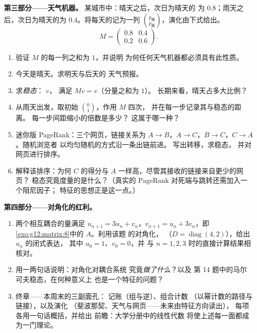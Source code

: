 \begin{problem}
\medskip
\noindent\textbf{第三部分——天气机器。}
某城市中：晴天之后，次日为晴天的
为 $0.8$；雨天之后，次日为晴天的为
$0.4$。将每天的记为一列
$\binom{p_{\text{晴}}}{p_{\text{雨}}}$，演化由下式给出。
\[
M = \begin{pmatrix} 0.8 & 0.4\\ 0.2 & 0.6 \end{pmatrix}.
\]
\begin{enumerate}[resume]
  \item 验证 $M$ 的每一列之和为 $1$，并说明
        为何任何天气机器都必须具有此性质。
  \item 今天是晴天。求明天与后天的
        天气预报。
  \item 求\emph{稳态}： $v$，
        满足 $Mv = v$（分量之和为 $1$）。
        长期来看，晴天占多大比例？
  \item 从雨天出发，取初始 $\binom01$，作用 $M$ 四次，
        并在每一步记录其与稳态的距离。
        每一步间距缩小的倍数是多少？
        这属于哪一种？
  \item 迷你版 PageRank：三个网页，链接关系为
        $A \to B$，$A \to C$，$B \to C$，$C \to A$。随机浏览者
        以均匀随机的方式沿一条出链前进。
        写出转移，求稳态，
        并对网页进行排序。
  \item 解释该排序：为何 $C$ 的得分与
        $A$ 一样高，尽管其接收的链接来自更少的网页？
        稳态究竟度量的是什么？（真实的 PageRank
        对死端与跳转还需加入一个阻尼因子；
        特征的思想正是这一点。）
\end{enumerate}

\medskip
\noindent\textbf{第四部分——对角化的红利。}
\begin{enumerate}[resume]
  \item 两个相互耦合的量满足
        $u_{n+1} = 3u_n + v_n$，$v_{n+1} = u_n + 3v_n$，即
        \cref{exo:g12:matrix:8}中的 $A$。利用该题
        的对角化，
        （$D = \operatorname{diag}(4, 2)$），给出 $u_n$ 的闭式表达，
        其中 $u_0 = 1$、$v_0 = 0$，并
        与 $n = 1, 2, 3$ 时的直接计算结果相核对。
  \item 用一两句话说明：对角化对耦合系统
        究竟\emph{做了什么}？以及
        第 14 题中的马尔可夫稳态，在何种意义上
        也是一个特征的问题？
  \item 终章——本周末的三副面孔：
        记账（组与逆）、组合计数
        （以幂计数的路径与链接），以及演化
        （斐波那契、天气与网页——未来由特征方向读出），
        每项各用一句话概括，并给出
        前瞻：大学分册中的线性代数
        将使上述每一面都成为一门理论。
\end{enumerate}
\end{problem}
